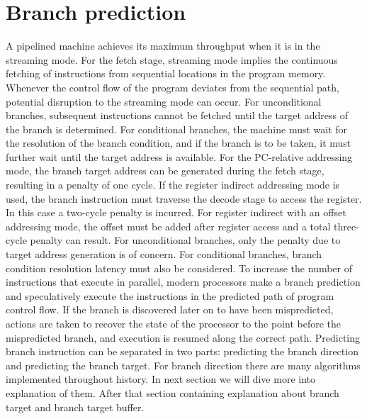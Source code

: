 \documentclass{scrreprt}
\begin{document}
\newpage
{}
\section*{Branch prediction}
A pipelined machine achieves its maximum throughput when it is in the streaming mode. For the fetch stage, streaming mode implies the continuous fetching of instructions from sequential locations in the program memory. Whenever the control flow of the program deviates from the sequential path, potential disruption to the streaming mode can occur. For unconditional branches, subsequent instructions cannot be fetched until the target address of the branch is determined. For conditional branches, the machine must wait for the resolution of the branch condition, and if the branch is to be taken, it must further wait until the target address is available. For the PC-relative addressing mode, the branch target address can be generated during the fetch stage, resulting in a penalty of one cycle. If the register indirect addressing mode is used, the branch instruction must traverse the decode stage to access the register. In this case a two-cycle penalty is incurred. For register indirect with an offset addressing mode, the offset must be added after register access and a total three-cycle penalty can result. For unconditional branches, only the penalty due to target address generation is of concern. For conditional branches, branch condition resolution latency must also be considered. 
\newline
\newline
To increase the number of instructions that execute in
parallel, modern processors make a branch prediction and speculatively execute the instructions in the predicted path of program control flow. If the branch is discovered later on to have been mispredicted, actions are taken to recover the state of the processor to the point before the mispredicted branch, and execution is resumed along the correct path.
\newline 
\newline
Predicting branch instruction can be separated in two parts: predicting the branch direction and predicting the branch target. For branch direction there are many algorithms implemented throughout history. In next section we will dive more into explanation of them. After that section containing explanation about branch target and branch target buffer. 

\newpage
\end{document}
